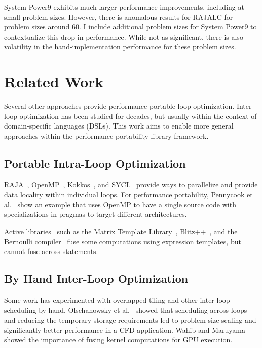 System Power9 exhibits much larger performance improvements, including at small
problem sizes. 
However, there is anomalous results for RAJALC for problem sizes around 60. 
I include additional problem sizes for System Power9 to contextualize this drop in performance. 
While not as significant, there is also volatility in the hand-implementation performance for these problem sizes.

\section{Related Work}

Several other approaches provide performance-portable loop optimization.
Inter-loop optimization has been studied for decades, but usually
within the context of domain-specific languages (DSLs).
This work aims to enable more general approaches within the performance portability library framework.

\subsection{Portable Intra-Loop Optimization}
RAJA~\cite{hornung2014RAJA}, OpenMP~\cite{OpenMPver5}, Kokkos~\cite{edwards2014kokkos},
and SYCL~\cite{SYCL2019} provide ways to parallelize and provide data locality
within individual loops.
For performance portability, Pennycook et al.~\cite{Pennycook2018} show an
example  that uses OpenMP to have a single source code with specializations
in pragmas to target different architectures.


Active libraries~\cite{VeldhuizenActive98} such as the 
Matrix Template Library~\cite{Siek:1999:SPM},
Blitz++~\cite{Veldhuizen2000},
and the Bernoulli compiler~\cite{ahmed2000framework,kotlyar1997relational} fuse some
computations using expression templates, but cannot fuse across statements.

\subsection{By Hand Inter-Loop Optimization}
Some work has experimented with overlapped tiling and other inter-loop
scheduling by hand.
Olschanowsky et al.~\cite{CathieSC14} showed that scheduling across loops and
reducing the temporary storage requirements led to problem size scaling and
significantly better performance in a CFD application.
Wahib and Maruyama~\cite{Wahib14} showed the importance of fusing kernel
computations for GPU execution.

